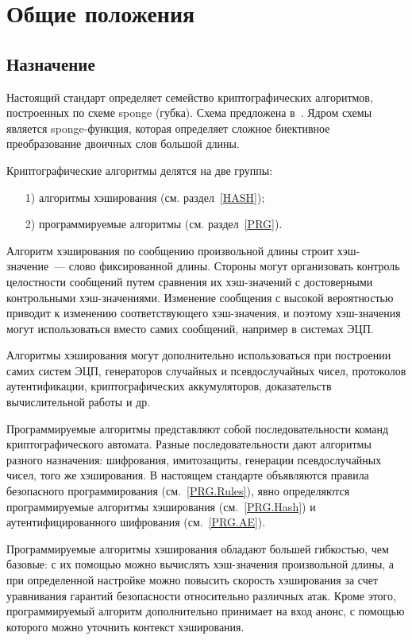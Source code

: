 \chapter{Общие положения}\label{COMMON}

\section{Назначение}

Настоящий стандарт определяет семейство криптографических алгоритмов,
построенных по схеме sponge (губка). Схема предложена в~\cite{Sponge}. 
Ядром схемы является sponge-функция, которая определяет сложное биективное 
преобразование двоичных слов большой длины. 

Криптографические алгоритмы делятся на две группы:
\begin{enumerate}
\item[1)]
алгоритмы хэширования (см. раздел~\ref{HASH});
\item[2)]
программируемые алгоритмы (см. раздел~\ref{PRG}).
\end{enumerate}

Алгоритм хэширования по сообщению произвольной длины строит 
хэш-значение~--- слово фиксированной длины.
%
Стороны могут организовать контроль целостности сообщений
путем сравнения их хэш-значений с достоверными контрольными хэш-значениями.
%
Изменение сообщения с высокой вероятностью приводит к изменению
соответствующего хэш-значения, и поэтому хэш-значения могут использоваться
вместо самих сообщений, например в системах ЭЦП.

Алгоритмы хэширования могут дополнительно использоваться при построении 
самих систем ЭЦП, генераторов случайных и псевдослучайных чисел, 
протоколов аутентификации,
криптографических аккумуляторов, 
доказательств вычислительной работы и др.

Программируемые алгоритмы представляют собой последовательности команд 
криптографического автомата. Разные последовательности дают алгоритмы разного 
назначения: шифрования, имитозащиты, генерации псевдослучайных чисел, 
того же хэширования.
%
В настоящем стандарте объявляются 
правила безопасного программирования (см.~\ref{PRG.Rules}),
явно определяются программируемые алгоритмы хэширования (см.~\ref{PRG.Hash}) 
и аутентифицированного шифрования (см.~\ref{PRG.AE}).

Программируемые алгоритмы хэширования обладают большей гибкостью, 
чем базовые: с их помощью можно вычислять хэш-значения произвольной длины,
а при определенной настройке можно повысить скорость хэширования 
за счет уравнивания гарантий безопасности относительно различных атак.
%
Кроме этого, программируемый алгоритм дополнительно принимает на вход анонс,
с помощью которого можно уточнить контекст хэширования.

